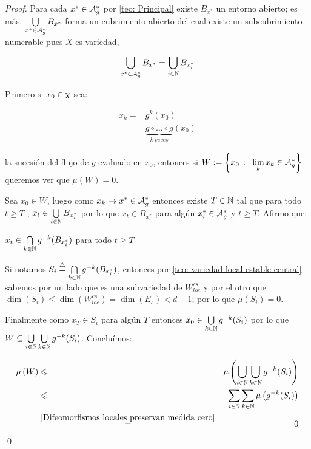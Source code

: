 \begin{proof}
	Para cada $x^* \in \mathcal{A}_{g}^{*}$ por \ref{teo: Principal} existe $B_{x^*}$ un entorno abierto; es m\'as, $\bigcup\limits_{x^* \in \mathcal{A}_{g}^{*}}{B_{x^{*}}}$ forma un cubrimiento abierto del cual existe un subcubrimiento numerable pues $X$ es variedad, \ie
	
	\[
	\bigcup\limits_{x^* \in \mathcal{A}_{g}^{*}}{B_{x^{*}}} = \bigcup\limits_{i \in {\mathbb{N}}}{B_{x^{*}_{i}}}
	\]
	
	
	Primero si $x_0 \in \upchi$ sea:
	
	\begin{equation*}
	\begin{aligned}
	x_k = & g^k(x_0) \\
	= & \underbrace{g \circ \dots \circ g }_{k \ veces} (x_0)
	\end{aligned}
	\end{equation*}
	
	la sucesi\'on del flujo de $g$ evaluado en $x_0$, entonces si $W := \sett{x_0 \ \colon \ \Biglim{k}{x_k \in \mathcal{A}_g^{*}}}$ queremos ver que $\mu(W) = 0$.
	
	Sea $x_0 \in W$, luego como $x_k \rightarrow x^* \in \mathcal{A}_{g}^{*}$ entonces existe $T \in {\mathbb{N}}$ tal que para todo $t \ge T$ , $x_t \in  \bigcup\limits_{i \in {\mathbb{N}}}{B_{x^{*}_{i}}}$ por lo que $x_t \in B_{x^{*}_{i}}$ para alg\'un $x_{i}^{*} \in \mathcal{A}_{g}^{*}$ y $t \ge T$. Afirmo que:
	
	
	\begin{lemma}
		\label{lemma: teo_principal}
		$x_t \in \bigcap\limits_{k \in {\mathbb{N}}}{g^{-k}(B_{x_{i}^{*}})}$ para todo $t \ge T$
	\end{lemma}
	
	Si notamos $S_i \stackrel{\triangle}{=} \bigcap\limits_{k \in {\mathbb{N}}}{g^{-k}(B_{x_{i}^{*}})}$, entonces por \ref{teo: variedad local estable central} sabemos por un lado que es una subvariedad de $W_{loc}^{cs}$ y por el otro que $\dim(S_i) \le \dim(W_{loc}^{cs}) = \dim(E_s) < d-1$; por lo que $\mu(S_i) = 0$.
	
	
	Finalmente como $x_{T} \in S_i$ para alg\'un $T$ entonces $x_0 \in \bigcup\limits_{k \in {\mathbb{N}}}{g^{-k}(S_i)}$ por lo que $W \subseteq \bigcup\limits_{i \in {\mathbb{N}}}{\bigcup\limits_{k \in {\mathbb{N}}}{g^{-k}(S_i)}}$. Conclu\'imos:
	
	\begin{equation*}
	\begin{aligned}
	\mu \left(W\right) & \leqslant & \mu \left(\bigcup\limits_{i \in {\mathbb{N}}}{\bigcup\limits_{k \in {\mathbb{N}}}{g^{-k}(S_i)}} \right) \\
	& \leqslant & \sum\limits_{i \in {\mathbb{N}}}{\sum\limits_{k \in {\mathbb{N}}}{\mu \left(g^{-k}(S_i)\right)}} \\
	& \stackrel{\ref{Difeomorfismos locales preservan medida cero}}{=} & 0
	\end{aligned}
	\end{equation*}\qed
	
	
\end{proof}

